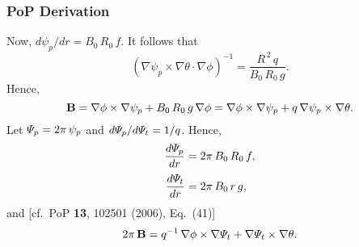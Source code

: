 \documentclass[notitlepage,12pt]{article}
\begin{document}
\subsubsection{PoP Derivation}
Now, $d\psi_p/dr = B_0\,R_0\,f$. It follows that
\begin{equation}
(\nabla\psi_p\times\nabla\theta\cdot\nabla\phi)^{-1}=\frac{R^{\,2}\,q}{B_0\,R_0\,g}.
\end{equation}
Hence,
\begin{equation}
{\bf B} = \nabla\phi\times\nabla\psi_p + B_0\,R_0\,g\,\nabla\phi = \nabla\phi\times\nabla\psi_p + q\,\nabla\psi_p\times\nabla\theta.
\end{equation}
Let ${\mit\Psi}_p = 2\pi\,\psi_p$ and $d{\mit\Psi}_p/d{\mit\Psi}_t = 1/q$. 
Hence,
\begin{align}
\frac{d{\mit\Psi}_p}{dr} &= 2\pi\,B_0\,R_0\,f,\\[0.5ex]
\frac{d{\mit\Psi}_t}{dr} &= 2\pi\,B_0\,r\,g,
\end{align}
and [cf.\ PoP {\bf 13}, 102501 (2006), Eq.~(41)]
\begin{equation}
2\pi\,{\bf B} = q^{-1}\,\nabla\phi\times\nabla{\mit\Psi}_t + \nabla{\mit\Psi}_t\times\nabla\theta.
\end{equation}
\end{document}
